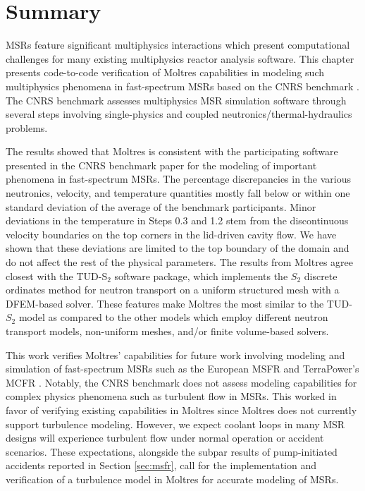 \section{Summary}

\glspl{MSR} feature significant multiphysics interactions which present
computational challenges for many existing multiphysics reactor analysis
software. This chapter presents code-to-code verification of Moltres
capabilities in modeling such multiphysics phenomena in fast-spectrum
\glspl{MSR} based on the CNRS benchmark \cite{tiberga_results_2020}.
The CNRS benchmark assesses multiphysics \gls{MSR} simulation
software through several steps involving single-physics and coupled
neutronics/thermal-hydraulics problems.

The results showed that Moltres is consistent with the participating software
presented in the CNRS benchmark paper for the modeling of important phenomena
in fast-spectrum \glspl{MSR}. The percentage discrepancies in the various
neutronics, velocity, and temperature quantities mostly fall below or within
one standard deviation of the average of the benchmark participants.
Minor deviations in the temperature in Steps 0.3 and 1.2 
stem from the discontinuous velocity
boundaries on the top corners in the lid-driven cavity flow. We have shown that
these deviations are limited to the top boundary of the domain and do not
affect the rest of the physical parameters. The results from
Moltres agree closest with the TUD-S$_2$ software package, which implements the
$S_2$ discrete ordinates method for
neutron transport on a uniform structured mesh with a \gls{DFEM}-based solver.
These features make Moltres the most similar to the TUD-$S_2$ model as compared
to the other models which employ different neutron transport models,
non-uniform meshes, and/or finite volume-based solvers.

This work verifies Moltres' capabilities for future work involving modeling and
simulation of fast-spectrum \glspl{MSR} such as the European \gls{MSFR} and
TerraPower's \gls{MCFR} \cite{terrapower_terrapower_2021}. Notably, the CNRS
benchmark does not assess modeling capabilities for complex physics phenomena
such as turbulent flow in \glspl{MSR}. This worked in favor of verifying
existing capabilities in Moltres since Moltres does not currently support
turbulence modeling. However, we expect coolant loops in many \gls{MSR} designs
will experience turbulent flow under normal operation or accident scenarios.
These expectations, alongside the subpar results of pump-initiated accidents
reported in Section \ref{sec:msfr}, call for the implementation and
verification of a turbulence model in Moltres for accurate modeling of
\glspl{MSR}.

\FloatBarrier
